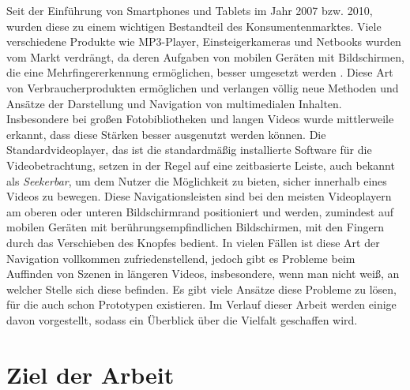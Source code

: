 \documentclass[11pt,a4paper]{report}
\begin{document}
Seit der Einführung von Smartphones und Tablets im Jahr 2007 bzw. 2010, wurden diese zu einem wichtigen Bestandteil des Konsumentenmarktes. Viele verschiedene Produkte wie MP3-Player, Einsteigerkameras und Netbooks wurden vom Markt verdrängt, da deren Aufgaben von mobilen Geräten mit Bildschirmen, die eine Mehrfingererkennung ermöglichen, besser umgesetzt werden \cite{schoeffmann2014stack}. Diese Art von Verbraucherprodukten ermöglichen und verlangen völlig neue Methoden und Ansätze der Darstellung und Navigation von multimedialen Inhalten. Insbesondere bei großen Fotobibliotheken und langen Videos wurde mittlerweile erkannt, dass diese Stärken besser ausgenutzt werden können. Die Standardvideoplayer, das ist die standardmäßig installierte Software für die Videobetrachtung, setzen in der Regel auf eine zeitbasierte Leiste, auch bekannt als \textit{Seekerbar}, um dem Nutzer die Möglichkeit zu bieten, sicher innerhalb eines Videos zu bewegen. Diese Navigationsleisten sind bei den meisten Videoplayern am oberen oder unteren Bildschirmrand positioniert und werden, zumindest auf mobilen Geräten mit berührungsempfindlichen Bildschirmen, mit den Fingern durch das Verschieben des Knopfes bedient. In vielen Fällen ist diese Art der Navigation vollkommen zufriedenstellend, jedoch gibt es Probleme beim Auffinden von Szenen in längeren Videos, insbesondere, wenn man nicht weiß, an welcher Stelle sich diese befinden. Es gibt viele Ansätze diese Probleme zu lösen, für die auch schon Prototypen existieren. Im Verlauf dieser Arbeit werden einige davon vorgestellt, sodass ein Überblick über die Vielfalt geschaffen wird. \cite{furht2009handbook}

\section{Ziel der Arbeit}
\end{document}
